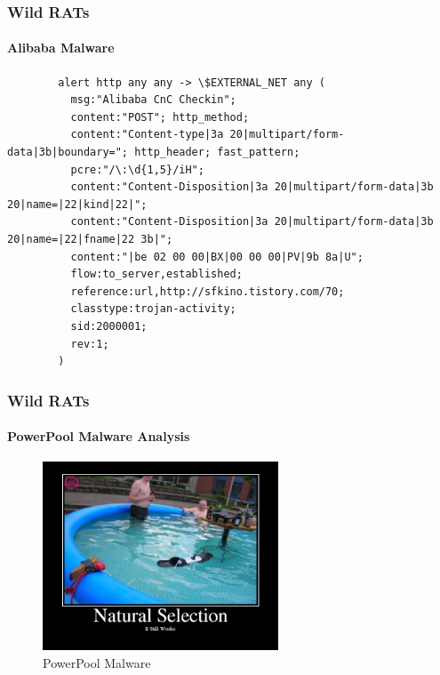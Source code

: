 \documentclass[aspectratio=169]{beamer}
\begin{document}
\begin{frame}[fragile]{}
  \frametitle{Wild RATs}
  \framesubtitle{Alibaba Malware}
  \begin{center}
    \begin{tcolorbox}[title=alibaba.rules,colback=black]
    \begin{minipage}{0.5\textwidth}
      \begin{verbatim}
        alert http any any -> \$EXTERNAL_NET any (
          msg:"Alibaba CnC Checkin";
          content:"POST"; http_method;
          content:"Content-type|3a 20|multipart/form-data|3b|boundary="; http_header; fast_pattern;
          pcre:"/\:\d{1,5}/iH";
          content:"Content-Disposition|3a 20|multipart/form-data|3b 20|name=|22|kind|22|";
          content:"Content-Disposition|3a 20|multipart/form-data|3b 20|name=|22|fname|22 3b|";
          content:"|be 02 00 00|BX|00 00 00|PV|9b 8a|U";
          flow:to_server,established;
          reference:url,http://sfkino.tistory.com/70;
          classtype:trojan-activity;
          sid:2000001;
          rev:1;
        )
      \end{verbatim}
    \end{minipage}
    \end{tcolorbox}
  \end{center}
\end{frame}

\begin{frame}
  \frametitle{Wild RATs}
  \framesubtitle{PowerPool Malware Analysis}
  \begin{center}
    \begin{figure}
      \includegraphics[width=7cm,keepaspectratio]{power_pool_meme}
      \caption{PowerPool Malware}
    \end{figure}
  \end{center}
\end{frame}
\end{document}
